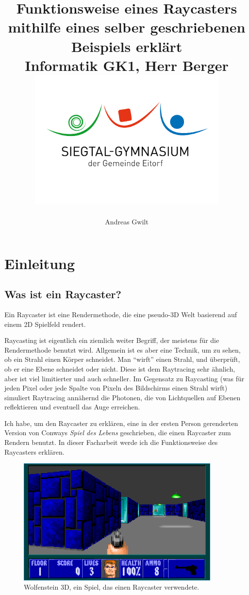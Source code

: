 \documentclass[a4paper,12pt]{report}
\title{{Funktionsweise eines Raycasters mithilfe eines selber geschriebenen Beispiels erkl\"art \vspace{1cm}} \\
        {\large Informatik GK1, Herr Berger} \\
        {\includegraphics[width=10cm]{sge.jpg}}}
\author{Andreas Gwilt}
\newcommand{\mychapter}[2]{
    \setcounter{chapter}{#1}
    \setcounter{section}{0}
    \chapter*{#2}
    \addcontentsline{toc}{chapter}{#2}
}
\begin{document}
\maketitle
\tableofcontents

\setcounter{page}{0}

\mychapter{1}{Einleitung}

\section{Was ist ein Raycaster?}
Ein Raycaster ist eine Rendermethode, die eine pseudo-3D Welt basierend auf einem 2D Spielfeld rendert\cite{scratch}.

Raycasting ist eigentlich ein ziemlich weiter Begriff, der meistens f\"ur die Rendermethode benutzt wird. Allgemein ist es aber eine Technik, um zu sehen, ob ein Strahl einen K\"orper schneidet. Man ``wirft'' einen Strahl, und \"uberpr\"uft, ob er eine Ebene schneidet oder nicht. Diese ist dem Raytracing sehr \"ahnlich, aber ist viel limitierter und auch schneller. Im Gegensatz zu Raycasting (was f\"ur jeden Pixel oder jede Spalte von Pixeln des Bildschirms einen Strahl wirft) simuliert Raytracing ann\"ahernd die Photonen, die von Lichtquellen auf Ebenen reflektieren und eventuell das Auge erreichen.

Ich habe, um den Raycaster zu erkl\"aren, eine in der ersten Person gerenderten Version von Conways \textit{Spiel des Lebens}\cite{life} geschrieben, die einen Raycaster zum Rendern benutzt. In dieser Facharbeit werde ich die Funktionsweise des Raycasters erkl\"aren.

\begin{figure}[htbp] 
        \centering
        \includegraphics[width=4in]{wolf3d.png} 
        \caption{Wolfenstein 3D, ein Spiel, das einen Raycaster verwendete.}
        \label{fig:wolf3d}
\end{figure}
\end{document}

